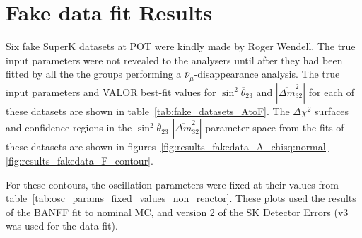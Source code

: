 
\section{Fake data fit Results}

\label{app:fake_data_fit_results}

Six fake SuperK datasets at \FakePot POT were kindly made by Roger Wendell. The true input parameters 
were not revealed to the analysers until after they had been fitted by all the the groups performing a 
$\bar{\nu}_{\mu}$-disappearance analysis. The true input parameters and VALOR best-fit values for 
$\sin^{2}\overline{\theta}_{23}$ and $|\overline{\Delta m}^{2}_{32}|$ for each of these datasets are shown 
in table~\ref{tab:fake_datasets_AtoF}. The $\Delta \chi^{2}$ surfaces and confidence regions in the 
$\sin^{2}\overline{\theta}_{23}$-$|\overline{\Delta m}^{2}_{32}|$ parameter space from the fits of these datasets 
are shown in figures~\ref{fig:results_fakedata_A_chisq:normal}-\ref{fig:results_fakedata_F_contour}.

For these contours, the oscillation parameters were fixed at their values from table~\ref{tab:osc_params_fixed_values_non_reactor}.
These plots used the results of the BANFF fit to nominal MC, and version 2 of the SK Detector Errors (v3 was used for the data fit).

